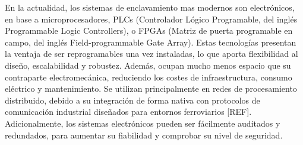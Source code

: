     En la actualidad, los sistemas de enclavamiento mas modernos son electrónicos, en base a microprocesadores, PLCs (Controlador Lógico Programable, del inglés Programmable Logic Controllers), o FPGAs (Matriz de puerta programable en campo, del inglés Field-programmable Gate Array). Estas tecnologías presentan la ventaja de ser reprogramables una vez instaladas, lo que aporta flexibilidad al diseño, escalabilidad y robustez. Además, ocupan mucho menos espacio que su contraparte electromecánica, reduciendo los costes de infraestructura, consumo eléctrico y mantenimiento. Se utilizan principalmente en redes de procesamiento distribuido, debido a su integración de forma nativa con protocolos de comunicación industrial diseñados para entornos ferroviarios [REF]. Adicionalmente, los sistemas electrónicos pueden ser fácilmente auditados y redundados, para aumentar su fiabilidad y comprobar su nivel de seguridad.